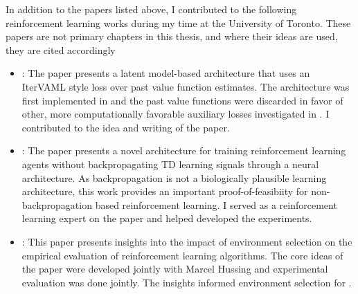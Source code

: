 In addition to the papers listed above, I contributed to the following reinforcement learning works during my time at the University of Toronto. These papers are not primary chapters in this thesis, and where their ideas are used, they are cited accordingly
\begin{itemize}
	\item {}: The paper presents a latent model-based architecture that uses an IterVAML \parencite{itervaml} style loss over past value function estimates. The architecture was first implemented in \textcite{voelcker2023lambda,voelcker2025mad,voelcker2025calibrated} and the past value functions were discarded in favor of other, more computationally favorable auxiliary losses investigated in \textcite{voelcker2024when}.
	I contributed to the idea and writing of the paper.
	\item {}: The paper presents a novel architecture for training reinforcement learning agents without backpropagating TD learning signals through a neural architecture.
	As backpropagation is not a biologically plausible learning architecture, this work provides an important proof-of-feasibiity for non-backpropagation based reinforcement learning.
    I served as a reinforcement learning expert on the paper and helped developed the experiments.
	\item {}: This paper presents insights into the impact of environment selection on the empirical evaluation of reinforcement learning algorithms.
	The core ideas of the paper were developed jointly with Marcel Hussing and experimental evaluation was done jointly.
    The insights informed environment selection for \textcite{voelcker2025mad}.
\end{itemize}

